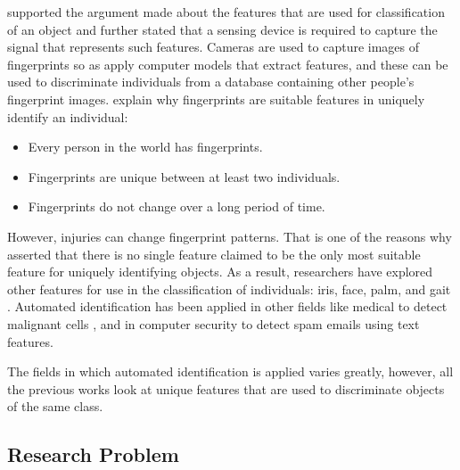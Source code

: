  \citeauthor{duda2012pattern} \citeyear{duda2012pattern} \cite{duda2012pattern} supported the argument made about the features that are used for classification of an object and further stated that a sensing device is required to capture the signal that represents such features. Cameras are used to capture images of fingerprints so as apply computer models that extract features, and these can be used to discriminate individuals from a database containing other people's fingerprint images. \citeauthor{maltoni2009handbook} \citeyear{maltoni2009handbook} \cite{maltoni2009handbook} explain why fingerprints are suitable features in uniquely identify an individual:
 \begin{itemize}
     \item Every person in the world has fingerprints.
     \item Fingerprints are unique between at least two individuals.
     \item Fingerprints do not change over a long period of time.
 \end{itemize}
However, injuries can change fingerprint patterns. That is one of the reasons why \citeauthor{jain2004introduction} \citeyear{jain2004introduction} \cite{jain2004introduction} asserted that there is no single feature claimed to be the only most suitable feature for uniquely identifying objects. As a result, researchers have explored other features for use in the classification of individuals: iris, face, palm, and gait \cite{jain2007handbook}.     
 Automated identification has been applied in other fields like medical to detect malignant cells \cite{khan2019novel,esteva2017dermatologist}, and in computer security to detect spam emails \cite{faris2019intelligent} using text features.
 
The fields in which automated identification is applied varies greatly, however, all the previous works look at unique features that are used to discriminate objects of the same class.

\subsection{Research Problem} 

